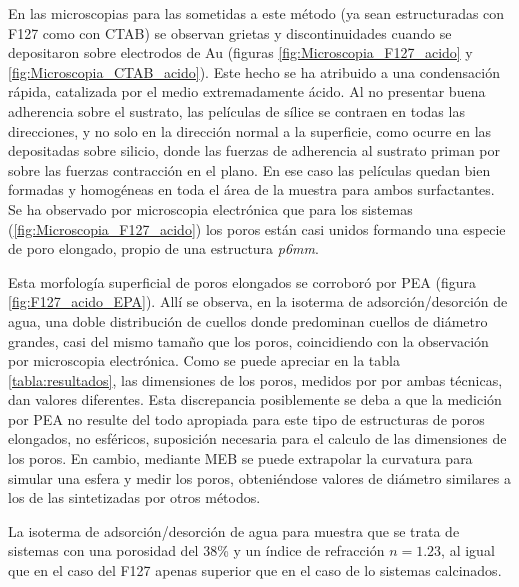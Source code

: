 		 En las microscopias para las \pdm\space sometidas a este método (ya sean estructuradas con F127 como con CTAB) se observan grietas y discontinuidades cuando se depositaron sobre electrodos de Au (figuras \ref{fig:Microscopia_F127_acido} y \ref{fig:Microscopia_CTAB_acido}). Este hecho se ha atribuido a una condensación rápida, catalizada por el medio extremadamente ácido. Al no presentar buena adherencia sobre el sustrato, las películas de sílice se contraen en todas las direcciones, y no solo en la dirección normal a la superficie, como ocurre en las \pdm\space depositadas sobre silicio, donde las fuerzas de adherencia al sustrato priman por sobre las fuerzas contracción en el plano\cite{Sakatani2006,Boissiere2005,Guillemin2010}. En ese caso las películas quedan bien formadas y homogéneas en toda el área de la muestra para ambos surfactantes. Se ha observado por microscopia electrónica que para los sistemas \pdmF\space (\ref{fig:Microscopia_F127_acido}) los  poros están casi unidos formando una especie de poro elongado, propio de una estructura \textit{p6mm}\cite{GonzalezSolveyra2017}. 
	
		 Esta morfología superficial de poros elongados se corroboró por PEA (figura \ref{fig:F127_acido_EPA}). Allí se observa, en la isoterma de adsorción/desorción de agua, una doble distribución de cuellos donde predominan cuellos de diámetro grandes, casi del mismo tamaño que los poros, coincidiendo con la observación por microscopia electrónica.
		 Como se puede apreciar en la tabla \ref{tabla:resultados}, las dimensiones de los poros, medidos por por ambas técnicas, dan valores diferentes. Esta discrepancia posiblemente se deba a que la medición por PEA no resulte del todo apropiada para este tipo de estructuras de poros elongados, no esféricos, suposición necesaria para el calculo de las dimensiones de los poros. En cambio, mediante MEB se puede extrapolar la curvatura para simular una esfera y medir los poros, obteniéndose valores de diámetro similares a los de las \pdmF sintetizadas por otros métodos.

		 La isoterma de adsorción/desorción de agua para \pdmC\space muestra que se trata de sistemas con una porosidad del 38\% y un índice de refracción $n=1.23$, al igual que en el caso del F127 apenas superior que en el caso de lo sistemas calcinados.
		
